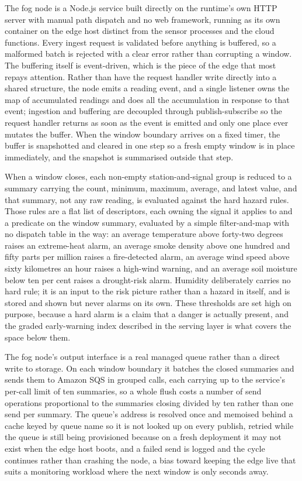 \documentclass[conference]{IEEEtran}
\begin{document}
The fog node is a Node.js service built directly on the runtime's own HTTP server with manual path dispatch and no web framework, running as its own container on the edge host distinct from the sensor processes and the cloud functions. Every ingest request is validated before anything is buffered, so a malformed batch is rejected with a clear error rather than corrupting a window. The buffering itself is event-driven, which is the piece of the edge that most repays attention. Rather than have the request handler write directly into a shared structure, the node emits a reading event, and a single listener owns the map of accumulated readings and does all the accumulation in response to that event; ingestion and buffering are decoupled through publish-subscribe so the request handler returns as soon as the event is emitted and only one place ever mutates the buffer. When the window boundary arrives on a fixed timer, the buffer is snapshotted and cleared in one step so a fresh empty window is in place immediately, and the snapshot is summarised outside that step.

When a window closes, each non-empty station-and-signal group is reduced to a summary carrying the count, minimum, maximum, average, and latest value, and that summary, not any raw reading, is evaluated against the hard hazard rules. Those rules are a flat list of descriptors, each owning the signal it applies to and a predicate on the window summary, evaluated by a simple filter-and-map with no dispatch table in the way: an average temperature above forty-two degrees raises an extreme-heat alarm, an average smoke density above one hundred and fifty parts per million raises a fire-detected alarm, an average wind speed above sixty kilometres an hour raises a high-wind warning, and an average soil moisture below ten per cent raises a drought-risk alarm. Humidity deliberately carries no hard rule; it is an input to the risk picture rather than a hazard in itself, and is stored and shown but never alarms on its own. These thresholds are set high on purpose, because a hard alarm is a claim that a danger is actually present, and the graded early-warning index described in the serving layer is what covers the space below them.

The fog node's output interface is a real managed queue rather than a direct write to storage. On each window boundary it batches the closed summaries and sends them to Amazon SQS in grouped calls, each carrying up to the service's per-call limit of ten summaries, so a whole flush costs a number of send operations proportional to the summaries closing divided by ten rather than one send per summary. The queue's address is resolved once and memoised behind a cache keyed by queue name so it is not looked up on every publish, retried while the queue is still being provisioned because on a fresh deployment it may not exist when the edge host boots, and a failed send is logged and the cycle continues rather than crashing the node, a bias toward keeping the edge live that suits a monitoring workload where the next window is only seconds away.
\end{document}
